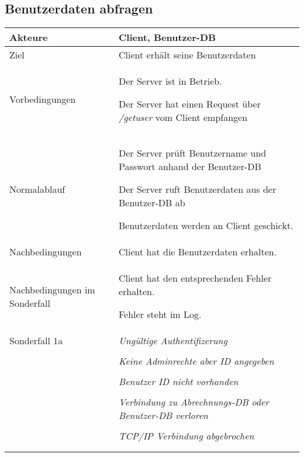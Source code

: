 \documentclass[a4paper,10pt,titlepage,parskip=true]{article}
\makeatletter
\newcommand\novspace{\@minipagetrue}
\newenvironment{owncompactitem}{%
\compactitem
}{%
\@finalstrut\@arstrutbox
\@nameuse{endcompactitem}%
\aftergroup\let\aftergroup\@finalstrut\aftergroup\@gobble
}
\newenvironment{owncompactenum}{%
\compactenum
}{%
\@finalstrut\@arstrutbox
\@nameuse{endcompactenum}%
\aftergroup\let\aftergroup\@finalstrut\aftergroup\@gobble
}
\newcommand{\usecase}[7]
{\subsection{#1}
\setlength{\extrarowheight}{2pt}
\begin{tabular}{|p{0.2\textwidth}|p{0.9\textwidth}|}
\hline
  Akteure & #2\\\hline
  Ziel & #3\\\hline
  Vorbedingungen & \novspace
  	\begin{owncompactitem}[-] #4 \end{owncompactitem} \\\hline
  Normalablauf & \vspace{-7pt}
  	\begin{owncompactenum}[1.] #6 \end{owncompactenum} \\\hline
  Nachbedingungen & \novspace
  	\begin{owncompactitem}[-] #5 \end{owncompactitem} \\\hline
  #7
\end{tabular}
}
\newcommand{\sonderfall}[4][\empty]
{
Sonderfall #2 & \vspace{-10pt}
	\textit{#3}
	\begin{owncompactenum}[{#2}.1] {#4} \end{owncompactenum}
  	\ifthenelse{\equal{#1}{\empty}}
    	{\\\hline} %
    	{\ensuremath{\rightarrow} #1 \\ [+1pt] \hline} %

}
\newcommand{\sondernachbedingung}[1]
{
Nachbedingungen im Sonderfall& \novspace
	\begin{owncompactitem}[-]
		#1
	\end{owncompactitem} \\\hline
}
\makeatother
\begin{document}
\usecase{Benutzerdaten abfragen}{Client, Benutzer-DB}%
{Client erhält seine Benutzerdaten}%
{%
  \item Der Server ist in Betrieb.
  \item Der Server hat einen Request über \textit{/getuser} vom Client empfangen
}
{%
  \item Client hat die Benutzerdaten erhalten.
}
{%
  \item Der Server prüft Benutzername und Passwort anhand der Benutzer-DB
  \item Der Server ruft Benutzerdaten aus der Benutzer-DB ab
  \item Benutzerdaten werden an Client geschickt.
}
{%
  \sondernachbedingung{
	\item Client hat den entsprechenden Fehler erhalten.
	\item Fehler steht im Log.
	}
	
	\sonderfall[Weiter mit normalem Betrieb]{1a}
    {Ungültige Authentifizerung}
    {
    \item Fehler wird ins Log geschrieben
  	\item Der Client erhält einen EAUTH Fehler mit HTTP-Status 401 Unauthorized
    }
    	\sonderfall[Weiter mit normalem Betrieb]{1b}
    {Keine Adminrechte aber ID angegeben}
    {
    \item Fehler wird ins Log geschrieben
  	\item Der Client erhält einen ENOTADMIN Fehler mit HTTP-Status 403 Forbidden
    }
    	\sonderfall[Weiter mit normalem Betrieb]{2a}
    {Benutzer ID nicht vorhanden}
    {
    \item Fehler wird ins Log geschrieben
  	\item Der Client erhält einen ENOID Fehler mit HTTP-Status 404 Not Found
    }
  \sonderfall[Der Server nimmt keine weiteren Anfragen an bis Verbindung zur Datenbank wieder hergestellt.]{*}%
	{Verbindung zu Abrechnungs-DB oder Benutzer-DB verloren}%
  	{
	\item Der Fehler wird ins Log geschrieben
	\item Der Client erhält einen EDATABASE Fehler mit HTTP-Status 503 Service Unavailable
  	}

\sonderfall[Weiter mit normalem Betrieb]{**}%
	{TCP/IP Verbindung abgebrochen}%
	{
	\item Fehlermeldung wird ins Log geschrieben
	}
}
\end{document}
